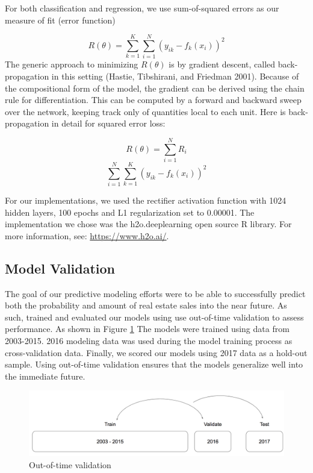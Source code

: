 \documentclass[12pt,]{article}
\begin{document}
For both classification and regression, we use sum-of-squared errors as
our measure of fit (error function)

\[
R(\theta)=\sum_{k=1}^K\sum_{i=1}^N(y_{ik}-f_{k}(x_i))^2
\] The generic approach to minimizing \(R(\theta)\) is by gradient
descent, called back-propagation in this setting (Hastie, Tibshirani,
and Friedman 2001). Because of the compositional form of the model, the
gradient can be derived using the chain rule for differentiation. This
can be computed by a forward and backward sweep over the network,
keeping track only of quantities local to each unit. Here is
back-propagation in detail for squared error loss:

\[
R(\theta) = \sum_{i=1}^NR_i
\] \[
\sum_{i=1}^N\sum_{k=1}^K(y_{ik}-f_{k}(x_i))^2
\]

For our implementations, we used the rectifier activation function with
1024 hidden layers, 100 epochs and L1 regularization set to 0.00001. The
implementation we chose was the h2o.deeplearning open source R library.
For more information, see: \url{https://www.h2o.ai/}.

\hypertarget{model-validation}{%
\subsection{Model Validation}\label{model-validation}}

The goal of our predictive modeling efforts were to be able to
successfully predict both the probability and amount of real estate
sales into the near future. As such, trained and evaluated our models
using use out-of-time validation to assess performance. As shown in
Figure \ref{fig:Train Test Validate} The models were trained using data
from 2003-2015. 2016 modeling data was used during the model training
process as cross-validation data. Finally, we scored our models using
2017 data as a hold-out sample. Using out-of-time validation ensures
that the models generalize well into the immediate future.

\begin{figure}[H]
\includegraphics[width=1\linewidth]{Sections/tables and figures/Train Validate Test} \caption{Out-of-time validation}\label{fig:Train Test Validate}
\end{figure}
\end{document}
